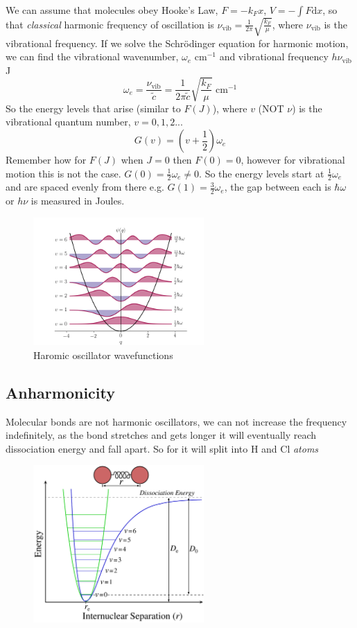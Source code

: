 \documentclass{article}
\newcommand{\mcm}{\text{ cm}^{-1}}
\begin{document}
    We can assume that molecules obey Hooke's Law, $F= - k_Fx$, $V = -\int F \text{d}x$, so that \emph{classical} harmonic frequency of 
    oscillation is $\nu_\text{vib} = \frac{1}{2\pi}\sqrt{\frac{k_F}{\mu}}$, where $\nu_\text{vib}$ is the 
    vibrational frequency. 
    If we solve the Schr{\"o}dinger equation for harmonic motion, we can find the vibrational wavenumber, 
    $\omega_e \mcm$ and vibrational frequency $h\nu_\text{vib}$ J
    $$\omega_e = \frac{\nu_\text{vib}}{\tilde{c}} = \frac{1}{2\pi\tilde{c}}\sqrt{\frac{k_F}{\mu}} \mcm$$
    So the energy levels that arise (similar to $F(J)$), where $v$ (NOT $\nu$) is the vibrational quantum number, $v = 0, 1, 2...$
    $$G(v) = \left(v + \frac{1}{2}\right)\omega_e$$
    Remember how for $F(J)$ when $J = 0$ then $F(0) = 0$, however for vibrational motion this is not the case.
    $G(0) = \frac{1}{2}\omega_e \neq 0$. So the energy levels start at $\frac{1}{2}\omega_e$ and are spaced evenly
    from there e.g. $G(1) = \frac{3}{2}\omega_e$, the gap between each is $\hbar\omega$ or $h\nu$ is measured in Joules.

    \begin{figure}[h]
        \centering
        \includegraphics[width=6.5cm]{vib.png}
        \caption{Haromic oscillator wavefunctions}
    \end{figure}

    \subsection{Anharmonicity}
    
    Molecular bonds are not harmonic oscillators, we can not increase the frequency indefinitely, as the bond stretches
    and gets longer it will eventually reach dissociation energy and fall apart. So for  it will split into
    H and Cl \emph{atoms}

    \begin{figure}[h]
        \centering
        \includegraphics[width=6.5cm]{dis.png}
    \end{figure}
\end{document}
